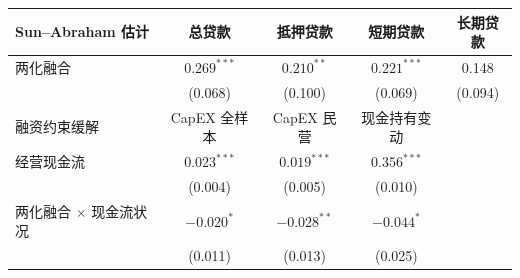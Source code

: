 {\scriptsize
\begin{center}
\begin{tabular}{lcccc}
  \toprule
  Sun--Abraham 估计 & 总贷款 & 抵押贷款 & 短期贷款 & 长期贷款 \\
  \midrule
  两化融合 & $0.269^{***}$ & $0.210^{**}$ & $0.221^{***}$ & 0.148 \\
           & (0.068) & (0.100) & (0.069) & (0.094) \\
  \midrule
  融资约束缓解 & CapEX 全样本 & CapEX 民营 & 现金持有变动 &  \\
  \midrule
  经营现金流 & $0.023^{***}$ & $0.019^{***}$ & $0.356^{***}$ &  \\
             & (0.004) & (0.005) & (0.010) &  \\
  两化融合 $\times$ 现金流状况 & $-0.020^{*}$ & $-0.028^{**}$ & $-0.044^{*}$ &  \\
                                & (0.011) & (0.013) & (0.025) &  \\
  \bottomrule
\end{tabular}
\end{center}
}
